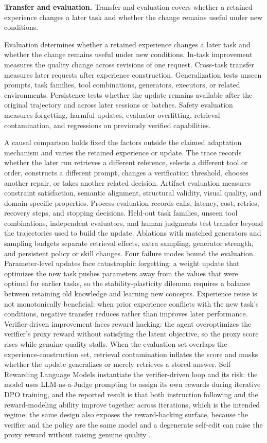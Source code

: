 \textbf{Transfer and evaluation.} Transfer and evaluation covers whether a retained experience changes a later task and whether the change remains useful under new conditions.

Evaluation determines whether a retained experience changes a later task and whether the change remains useful under new conditions. In-task improvement measures the quality change across revisions of one request. Cross-task transfer measures later requests after experience construction. Generalization tests unseen prompts, task families, tool combinations, generators, executors, or related environments. Persistence tests whether the update remains available after the original trajectory and across later sessions or batches. Safety evaluation measures forgetting, harmful updates, evaluator overfitting, retrieval contamination, and regressions on previously verified capabilities.

A causal comparison holds fixed the factors outside the claimed adaptation mechanism and varies the retained experience or update. The trace records whether the later run retrieves a different reference, selects a different tool or order, constructs a different prompt, changes a verification threshold, chooses another repair, or takes another related decision. Artifact evaluation measures constraint satisfaction, semantic alignment, structural validity, visual quality, and domain-specific properties. Process evaluation records calls, latency, cost, retries, recovery steps, and stopping decisions. Held-out task families, unseen tool combinations, independent evaluators, and human judgments test transfer beyond the trajectories used to build the update. Ablations with matched generators and sampling budgets separate retrieval effects, extra sampling, generator strength, and persistent policy or skill changes. Four failure modes bound the evaluation. Parameter-level updates face catastrophic forgetting: a weight update that optimizes the new task pushes parameters away from the values that were optimal for earlier tasks, so the stability-plasticity dilemma requires a balance between retaining old knowledge and learning new concepts. Experience reuse is not monotonically beneficial: when prior experience conflicts with the new task's conditions, negative transfer reduces rather than improves later performance. Verifier-driven improvement faces reward hacking: the agent overoptimizes the verifier's proxy reward without satisfying the latent objective, so the proxy score rises while genuine quality stalls. When the evaluation set overlaps the experience-construction set, retrieval contamination inflates the score and masks whether the update generalizes or merely retrieves a stored answer. Self-Rewarding Language Models instantiate the verifier-driven loop and its risk: the model uses LLM-as-a-Judge prompting to assign its own rewards during iterative DPO training, and the reported result is that both instruction following and the reward-modeling ability improve together across iterations, which is the intended regime; the same design also exposes the reward-hacking surface, because the verifier and the policy are the same model and a degenerate self-edit can raise the proxy reward without raising genuine quality \cite{yuan2024selfrewarding}.

